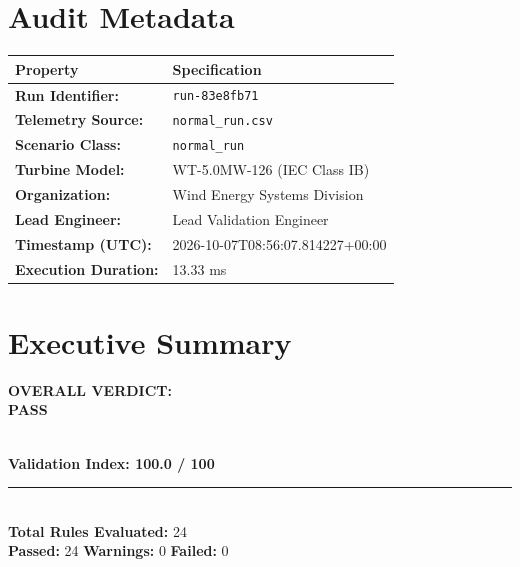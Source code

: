 \documentclass[10pt,a4paper]{article}
\begin{document}
\noindent
\begin{minipage}[t]{0.48\textwidth}
    \section*{Audit Metadata}
    \begin{tabularx}{\textwidth}{lX}
        \toprule
        \textbf{Property} & \textbf{Specification} \\
        \midrule
        \textbf{Run Identifier:} & \texttt{run-83e8fb71} \\
        \textbf{Telemetry Source:} & \texttt{normal_run.csv} \\
        \textbf{Scenario Class:} & \texttt{normal_run} \\
        \textbf{Turbine Model:} & WT-5.0MW-126 (IEC Class IB) \\
        \textbf{Organization:} & Wind Energy Systems Division \\
        \textbf{Lead Engineer:} & Lead Validation Engineer \\
        \textbf{Timestamp (UTC):} & 2026-10-07T08:56:07.814227+00:00 \\
        \textbf{Execution Duration:} & 13.33 ms \\
        \bottomrule
    \end{tabularx}
\end{minipage}
\hfill
\begin{minipage}[t]{0.48\textwidth}
    \section*{Executive Summary}
    \begin{tcolorbox}[colback=LightGray,colframe=BorderGray,arc=1mm]
        \begin{center}
            {\large \textbf{OVERALL VERDICT:}}\\[0.2cm]
            
                {\Huge \textbf{\textcolor{PassGreen}{PASS}}}
            
            \\[0.3cm]
            {\Large \textbf{Validation Index: 100.0 / 100}}\\[0.2cm]
            \rule{0.8\textwidth}{0.4pt}\\[0.2cm]
            \textbf{Total Rules Evaluated:} 24\\
            \textbf{Passed:} \textcolor{PassGreen}{24} \quad
            \textbf{Warnings:} \textcolor{WarnAmber}{0} \quad
            \textbf{Failed:} \textcolor{FailRed}{0}
        \end{center}
    \end{tcolorbox}
\end{minipage}
\end{document}

